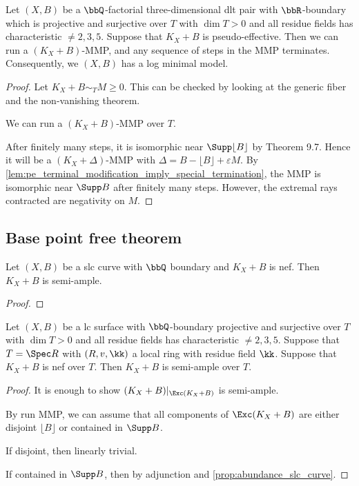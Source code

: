     \begin{theorem}\label{thm:run_mmp_pseudo_effective}
        Let \((X,B)\) be a \(\bbQ\)-factorial three-dimensional dlt pair with \(\bbR\)-boundary which is projective and surjective over \(T\) with \(\dim T >0\) and all residue fields has characteristic \(\neq 2,3,5\).
        Suppose that \(K_X + B\) is pseudo-effective.
        Then we can run a \((K_X + B)\)-MMP, and any sequence of steps in the MMP terminates.
        Consequently, we \((X,B)\) has a log minimal model.
    \end{theorem}
    \begin{proof}
        Let \(K_X + B \sim_T M \geq 0\).
        This can be checked by looking at the generic fiber and the non-vanishing theorem.

        We can run a \((K_X + B)\)-MMP over \(T\).

        After finitely many steps, it is isomorphic near \(\Supp \lfloor B \rfloor\) by Theorem 9.7.
        Hence it will be a \((K_X + \Delta)\)-MMP with \(\Delta = B - \lfloor B \rfloor + \varepsilon M\).
        By \cref{lem:pe_terminal_modification_imply_special_termination}, the MMP is isomorphic near \(\Supp B\) after finitely many steps.
        However, the extremal rays contracted are negativity on \(M\).
    \end{proof}


\subsection{Base point free theorem}

    \begin{proposition}\label{prop:abundance_slc_curve}
        Let \((X,B)\) be a slc curve with \(\bbQ\) boundary and \(K_X + B\) is nef.
        Then \(K_X + B\) is semi-ample.
    \end{proposition}
    \begin{proof}
        
    \end{proof}

    \begin{proposition}\label{prop:abundance_lc_surface}
        Let \((X,B)\) be a lc surface with \(\bbQ\)-boundary projective and surjective over \(T\) with \(\dim T >0\) and all residue fields has characteristic \(\neq 2,3,5\).
        Suppose that \(T = \Spec R\) with \((R,v,\kk)\) a local ring with residue field \(\kk\).
        Suppose that \(K_X + B\) is nef over \(T\).
        Then \(K_X + B\) is semi-ample over \(T\).
    \end{proposition}
    \begin{proof}
        It is enough to show \((K_X + B)|_{\Exc (K_X+B)}\) is semi-ample.

        By run MMP, we can assume that all components of \(\Exc (K_X+B)\) are either disjoint \(\lfloor B \rfloor\) or contained in \(\Supp B\).
        
        If disjoint, then linearly trivial.

        If contained in \(\Supp B\), then by adjunction and \cref{prop:abundance_slc_curve}.
    \end{proof}

